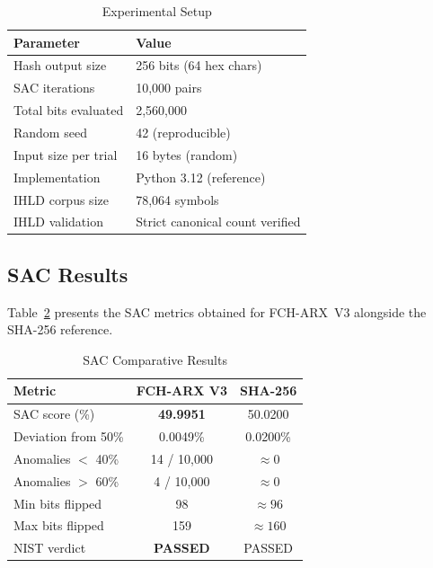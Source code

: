 \documentclass[12pt,journal]{IEEEtran}
\begin{document}
\begin{table}[H]
\centering
\caption{Experimental Setup}
\label{tab:setup}
\renewcommand{\arraystretch}{1.3}
\begin{tabular}{ll}
\toprule
\textbf{Parameter} & \textbf{Value} \\
\midrule
Hash output size          & 256 bits (64 hex chars)        \\
SAC iterations            & 10{,}000 pairs                 \\
Total bits evaluated      & 2{,}560{,}000                  \\
Random seed               & 42 (reproducible)              \\
Input size per trial      & 16 bytes (random)              \\
Implementation            & Python 3.12 (reference)        \\
IHLD corpus size          & 78{,}064 symbols               \\
IHLD validation           & Strict canonical count verified\\
\bottomrule
\end{tabular}
\end{table}

\subsection{SAC Results}

Table~\ref{tab:sac} presents the SAC metrics obtained for FCH-ARX~V3
alongside the SHA-256 reference.

\begin{table}[H]
\centering
\caption{SAC Comparative Results}
\label{tab:sac}
\renewcommand{\arraystretch}{1.3}
\begin{tabular}{lcc}
\toprule
\textbf{Metric} & \textbf{FCH-ARX V3} & \textbf{SHA-256} \\
\midrule
SAC score (\%)            & \textbf{49.9951} & 50.0200 \\
Deviation from 50\%       & 0.0049\%         & 0.0200\% \\
Anomalies $<$ 40\%        & 14 / 10{,}000    & $\approx 0$ \\
Anomalies $>$ 60\%        & 4 / 10{,}000     & $\approx 0$ \\
Min bits flipped          & 98               & $\approx 96$ \\
Max bits flipped          & 159              & $\approx 160$ \\
NIST verdict              & \textbf{PASSED}  & PASSED \\
\bottomrule
\end{tabular}
\end{table}
\end{document}
